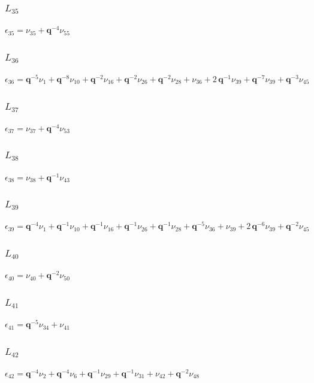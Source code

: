 \subsubsection*{$L_{35}$}
$
\epsilon_{35} = \nu_{35} + \boldsymbol{q}^{-4}\nu_{55}
$

\subsubsection*{$L_{36}$}
$
\epsilon_{36} = \boldsymbol{q}^{-5}\nu_{1} + \boldsymbol{q}^{-8}\nu_{10} + \boldsymbol{q}^{-2}\nu_{16} + \boldsymbol{q}^{-2}\nu_{26} + \boldsymbol{q}^{-2}\nu_{28} + \nu_{36} + 2\,\boldsymbol{q}^{-1}\nu_{39} + \boldsymbol{q}^{-7}\nu_{39} + \boldsymbol{q}^{-3}\nu_{45}
$

\subsubsection*{$L_{37}$}
$
\epsilon_{37} = \nu_{37} + \boldsymbol{q}^{-4}\nu_{53}
$

\subsubsection*{$L_{38}$}
$
\epsilon_{38} = \nu_{38} + \boldsymbol{q}^{-1}\nu_{43}
$

\subsubsection*{$L_{39}$}
$
\epsilon_{39} = \boldsymbol{q}^{-4}\nu_{1} + \boldsymbol{q}^{-1}\nu_{10} + \boldsymbol{q}^{-1}\nu_{16} + \boldsymbol{q}^{-1}\nu_{26} + \boldsymbol{q}^{-1}\nu_{28} + \boldsymbol{q}^{-5}\nu_{36} + \nu_{39} + 2\,\boldsymbol{q}^{-6}\nu_{39} + \boldsymbol{q}^{-2}\nu_{45}
$

\subsubsection*{$L_{40}$}
$
\epsilon_{40} = \nu_{40} + \boldsymbol{q}^{-2}\nu_{50}
$

\subsubsection*{$L_{41}$}
$
\epsilon_{41} = \boldsymbol{q}^{-5}\nu_{34} + \nu_{41}
$

\subsubsection*{$L_{42}$}
$
\epsilon_{42} = \boldsymbol{q}^{-4}\nu_{2} + \boldsymbol{q}^{-4}\nu_{6} + \boldsymbol{q}^{-1}\nu_{29} + \boldsymbol{q}^{-1}\nu_{31} + \nu_{42} + \boldsymbol{q}^{-2}\nu_{48}
$

